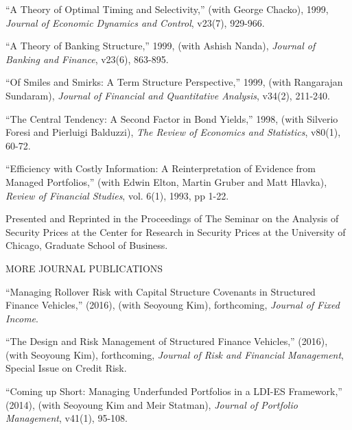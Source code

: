 \documentclass{article}
\begin{document}
\begin{etaremune}
\item
``A Theory of Optimal Timing and Selectivity,'' 
(with George Chacko), 1999, {\it Journal of
Economic Dynamics and Control}, v23(7), 929-966.

\item
``A Theory of Banking Structure,'' 1999, (with Ashish Nanda),
{\it Journal of Banking and Finance}, v23(6), 863-895. 

\item
``Of Smiles and Smirks: A Term Structure Perspective,'' 1999, (with
Rangarajan Sundaram), {\it Journal of Financial and Quantitative
Analysis}, v34(2), 211-240.


\item ``The Central Tendency: A Second Factor in Bond Yields,'' 1998,
(with Silverio Foresi and Pierluigi Balduzzi), {\it The Review of
Economics and Statistics}, v80(1), 60-72.

\item
``Efficiency with Costly Information: A Reinterpretation of
Evidence from Managed Portfolios,'' (with Edwin Elton, Martin Gruber and Matt 
Hlavka), {\it Review of Financial Studies}, vol. 6(1), 1993, pp 1-22. 

Presented and Reprinted in the Proceedings of The Seminar on the
Analysis of Security Prices at the Center for Research in Security
Prices at the University of Chicago, Graduate School of Business.


\begin{description}
\item[MORE JOURNAL PUBLICATIONS] \mbox{}
\end{description}


\item ``Managing Rollover Risk with Capital Structure Covenants
in Structured Finance Vehicles,'' (2016), (with Seoyoung Kim), forthcoming, {\it Journal of Fixed Income}. 

\item ``The Design and Risk Management of Structured Finance Vehicles,'' (2016), (with Seoyoung Kim), forthcoming, {\it Journal of Risk and Financial Management}, Special Issue on Credit Risk. 


\item ``Coming up Short: Managing Underfunded Portfolios in
a LDI-ES Framework,'' (2014), (with Seoyoung Kim and Meir Statman), {\it Journal of Portfolio Management}, v41(1), 95-108. 


\end{etaremune}
\end{document}
